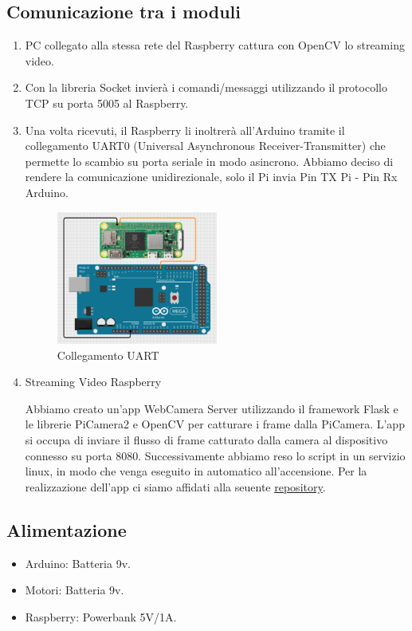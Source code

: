 \documentclass{article}
\begin{document}
\subsection{Comunicazione tra i moduli}
\begin{enumerate}
\item PC collegato alla stessa rete del Raspberry cattura con OpenCV lo streaming video.
\item  Con la libreria Socket invierà i comandi/messaggi utilizzando il protocollo TCP su porta 5005 al Raspberry.
\item Una volta ricevuti, il Raspberry li inoltrerà all'Arduino tramite il collegamento UART0 (Universal Asynchronous Receiver-Transmitter) che permette lo scambio su porta seriale in modo asincrono. Abbiamo deciso di rendere la comunicazione unidirezionale, solo il Pi invia Pin TX Pi - Pin Rx Arduino.  
\begin{figure}[h!]
  \centering
  \includegraphics[width=0.5\textwidth]{uart0.png}
    \caption{Collegamento UART}
\end{figure}

\item \cite{flaskstream} Streaming Video Raspberry

    Abbiamo creato un'app WebCamera Server utilizzando il framework Flask e le librerie PiCamera2 e OpenCV per catturare i frame dalla PiCamera. L'app si occupa di inviare il flusso di frame catturato dalla camera al dispositivo connesso su porta 8080.
    Successivamente abbiamo reso lo script in un servizio linux, in modo che venga eseguito in automatico all'accensione. Per la realizzazione dell'app ci siamo affidati alla seuente \href{https://github.com/miguelgrinberg/flask-video-streaming/tree/v1}{repository}. 
\end{enumerate}

\newpage

\subsection{Alimentazione}
\begin{itemize}
\item Arduino: Batteria 9v.
\item Motori: Batteria 9v.
\item Raspberry: Powerbank 5V/1A.
\end{itemize}
\end{document}
